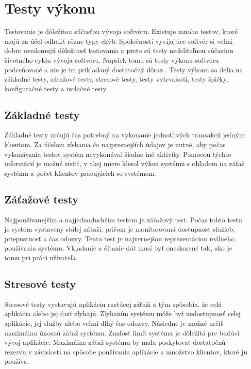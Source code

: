 \documentclass[12pt,oneside,final]{fithesis-utf8}
\begin{document}
\chapter{Testy výkonu}

Testovanie je dôležitou súčasťou vývoja softvéru. Existuje mnoho testov, ktoré majú za účel odhaliť rôzne typy chýb. Spoločnosti vyvíjajúce softvér si veľmi dobre uvedomujú dôležitosť testovania a preto sú testy nedeliteľnou súčasťou životného cyklu vývoja softvéru. Napriek tomu sú testy výkonu softvéru podceňované a nie je im prikladaný dostatočný dôraz \cite{Art}.
Testy výkonu sa delia na základné testy, záťažové testy, stresové testy, testy vytrvalosti, testy špičky, konfiguračné testy a izolačné testy.	

\section{Základné testy}
Základné testy určujú čas potrebný na vykonanie jednotlivých transakcií jedným klientom. Za účelom získania čo najpresnejších údajov je nutné, aby počas vykonávania testov systém nevykonával žiadne iné aktivity. Pomocou týchto informácií je možné zistiť, v akej miere klesol výkon systému s ohľadom na záťaž systému a počet klientov pracujúcich so systémom.

\section{Záťažové testy}
Najpoužívanejším a najjednoduchším testom je záťažový test. Počas tohto testu je systém vystavený stálej záťaži, pričom je monitorovaná dostupnosť služieb, priepustnosť a čas odozvy. Tento test je najvernejšou reprezentáciou reálneho používania systému. Vkladanie a čítanie dát musí byť oneskorené tak, ako je tomu pri práci užívateľa.

\section{Stresové testy}
Stresové testy vystavujú aplikáciu rastúcej záťaži a tým spôsobia, že celá aplikácia alebo jej časť zlyhajú. Zlyhaním systému môže byť nedostupnosť celej aplikácie, jej služby alebo veľmi dlhý čas odozvy. Následne je možné určiť maximálnu únosnú záťaž systému. Znalosť limít systému je dôležitá pre budúci vývoj aplikácie. Maximálna záťaž systému by mala poskytovať dostatočnú rezervu v závislosti na spôsobe používania aplikácie a množstvo klientov, ktoré ju používa. 
\end{document}
